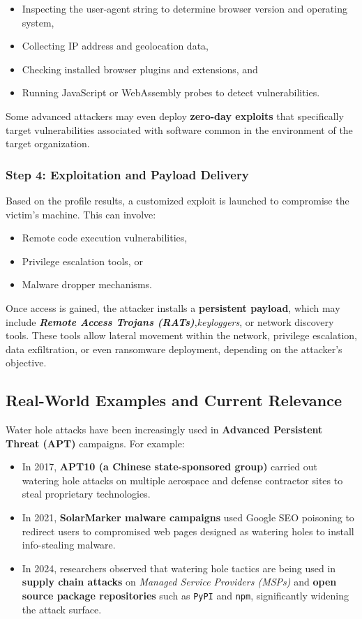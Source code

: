 {\begin{itemize}
    \item Inspecting the user-agent string to determine browser version and operating system,
    \item Collecting IP address and geolocation data,
    \item Checking installed browser plugins and extensions, and
    \item Running JavaScript or WebAssembly probes to detect vulnerabilities.
\end{itemize}

Some advanced attackers may even deploy \textbf{zero-day exploits} that specifically target vulnerabilities associated with software common in the environment of the target organization.

\subsubsection{\textbf{Step 4: Exploitation and Payload Delivery}}
Based on the profile results, a customized exploit is launched to compromise the victim’s machine. This can involve:

\begin{itemize}
    \item Remote code execution vulnerabilities,
    \item Privilege escalation tools, or
    \item Malware dropper mechanisms.
\end{itemize}

Once access is gained, the attacker installs a \textbf{persistent payload}, which may include \textbf{\textit{Remote Access Trojans (RATs)}},\textit{keyloggers}, or {network discovery tools}. These tools allow lateral movement within the network, privilege escalation, data exfiltration, or even ransomware deployment, depending on the attacker’s objective.

\subsection{\textbf{Real-World Examples and Current Relevance}}
Water hole attacks have been increasingly used in \textbf{Advanced Persistent Threat (APT)} campaigns. For example:
\begin{itemize}
    \item In 2017, \textbf{APT10 (a Chinese state-sponsored group)} carried out watering hole attacks on multiple aerospace and defense contractor sites to steal proprietary technologies.
    \item In 2021, \textbf{SolarMarker malware campaigns} used Google SEO poisoning to redirect users to compromised web pages designed as watering holes to install info-stealing malware.
    \item In 2024, researchers observed that watering hole tactics are being used in \textbf{supply chain attacks} on \textit{Managed Service Providers (MSPs)} and \textbf{ open source package repositories} such as \texttt{PyPI} and \texttt{npm}, significantly widening the attack surface.
\end{itemize}

}
